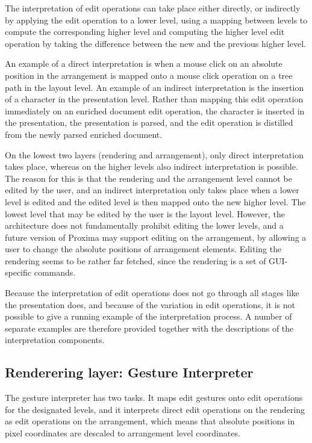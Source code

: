 The interpretation of edit operations can take place either directly, or indirectly by applying the edit operation to a lower level, using a mapping between levels to compute the corresponding higher level and computing the higher level edit operation by taking the difference between the new and the previous higher level.

An example of a direct interpretation is when a mouse click on an absolute position in the arrangement is mapped onto a mouse click operation on a tree path in the layout level. An example of an indirect interpretation is the insertion of a character in the presentation level. Rather than mapping this edit operation immediately on an enriched document edit operation, the character is inserted in the presentation, the presentation is parsed, and the edit operation is distilled from the newly parsed enriched document.

On the lowest two layers (rendering and arrangement), only direct interpretation takes place, whereas on the higher levels also indirect interpretation is possible. The reason for this is that the rendering and the arrangement level cannot be edited by the user, and an indirect interpretation only takes place when a lower level is edited and the edited level is then mapped onto the new higher level. The lowest level that may be edited by the user is the layout level. However, the architecture does not fundamentally prohibit editing the lower levels, and a future version of Proxima may support editing on the arrangement, by allowing a user to change the absolute positions of arrangement elements. Editing the rendering seems to be rather far fetched, since the rendering is a set of GUI-specific commands.

Because the interpretation of edit operations does not go through all stages like the presentation does, and because of the variation in edit operations, it is not possible to give a running example of the interpretation process. A number of separate examples are therefore provided together with the descriptions of the interpretation components.


%																
\subsection{Renderering layer: Gesture Interpreter} \label{sect:gestureInterpreter}

The gesture interpreter has two tasks. It maps edit gestures onto edit operations for the designated levels, and it interprets direct edit operations on the rendering as edit operations on the arrangement, which means that absolute positions in pixel coordinates are descaled to arrangement level coordinates. 

